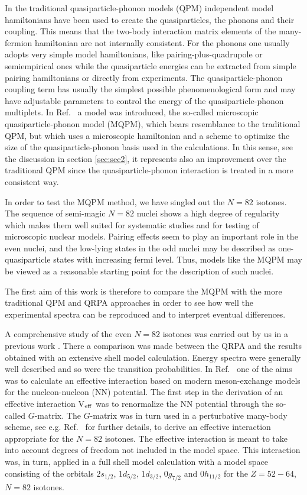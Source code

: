 In the traditional quasiparticle-phonon models (QPM) independent model 
hamiltonians have been used to create the quasiparticles, the phonons 
and their coupling. 
This means that the 
two-body interaction matrix elements of the many-fermion hamiltonian
are not internally consistent.
For the phonons one usually adopts very simple
model hamiltonians, like pairing-plus-quadrupole or semiempirical ones while
the quasiparticle energies can be extracted from simple pairing 
hamiltonians or directly from experiments. The quasiparticle-phonon 
coupling term has usually the simplest possible phenomenological form and may
have adjustable parameters to control the energy of the
quasiparticle-phonon multiplets.
In Ref.\ \cite{TOI95} a model was introduced, the so-called microscopic
quasiparticle-phonon model (MQPM), which bears resemblance to the
traditional QPM, but which uses a microscopic hamiltonian 
and a scheme to optimize the size of the
quasiparticle-phonon basis used in the calculations. In this sense, see the
discussion in section \ref{sec:sec2}, it represents also an improvement
over the traditional QPM since the quasiparticle-phonon interaction is 
treated in a more consistent way.

In order to test the MQPM method, we have singled out the 
$N=82$ isotones. 
The sequence of semi-magic $N=82$ nuclei 
shows a high degree of regularity which makes them well suited for 
systematic studies and for testing of microscopic nuclear models. 
Pairing effects seem to play an important role in the even nuclei, and the 
low-lying states in the odd nuclei may be described as 
one-quasiparticle states with increasing fermi level. Thus, models like the
MQPM may be viewed as a reasonable starting point for the description
of such nuclei.

The first aim of this work is therefore to compare 
the MQPM with the more traditional QPM and QRPA approaches in order to
see how well the experimental spectra can be reproduced and to interpret
eventual differences.  

A comprehensive study of the even $N=82$ isotones was carried out by us in a 
previous work \cite{HOL97}. There a comparison was made between 
the QRPA  and the results obtained with an extensive  shell model 
calculation. Energy spectra 
were generally well described and so were the 
transition probabilities. 
In Ref.\ \cite{HOL97} one of the aims was
to calculate an effective interaction based on
modern meson-exchange models for the nucleon-nucleon (NN) potential. 
The first step in the derivation of an effective interaction 
V$_{\rm eff}$ was to renormalize
the NN potential through the so-called $G$-matrix. The $G$-matrix was in turn
used in a perturbative many-body scheme, see e.g.
Ref.\ \cite{HJO95} for further details, to derive
an effective interaction appropriate for the $N=82$ isotones.
The effective interaction
is meant to take into account degrees of freedom not included in the model
space.
This  interaction 
was, in turn, applied in a full shell model  calculation 
with a model space consisting 
of the orbitals $2s_{1/2}$, $1d_{5/2}$, $1d_{3/2}$, $0g_{7/2}$ and $0h_{11/2}$ 
for the $Z=52 - 64$, $N=82$ isotones. 

